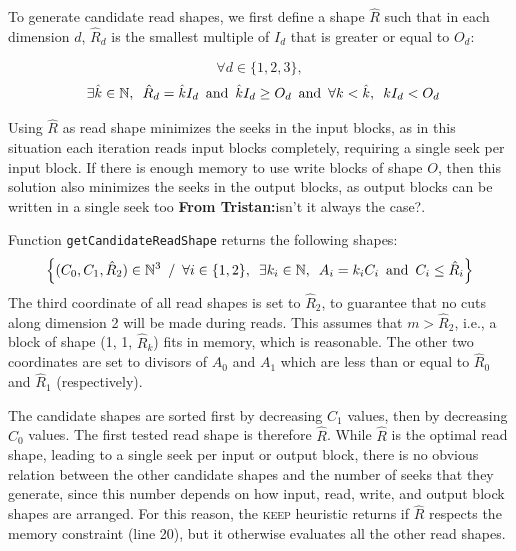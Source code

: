 \documentclass[sigconf, nonacm]{acmart}
\newcommand{\tristan}[1]{\color{orange}\textbf{From Tristan:}#1\color{black}}
\newcommand{\keep}[0]{\textsc{keep}\xspace}
\begin{document}

To generate candidate read shapes, we first define a shape $\hat R$ such
that in each dimension $d$, $\hat R_d$ is the smallest multiple of $I_d$
that is greater or equal to $O_d$:

\[
\forall d \in \{1, 2, 3\},
\]
\[
  \enskip \exists \hat k \in \mathbb{N}, \enskip \hat R_d = \hat kI_d \enskip \mathrm{and} \enskip \hat k I_d \geq O_d \enskip \mathrm{and} \enskip \forall k < \hat k, \enskip kI_d < O_d
\]

Using $\hat R$ as read shape minimizes the seeks in the input blocks, as
in this situation each iteration reads input blocks completely, requiring a
single seek per input block. If there is enough memory to use write blocks
of shape $O$, then this solution also minimizes the seeks in the output
blocks, as output blocks can be written in a single seek too \tristan{isn't it always the case?}.

Function \texttt{getCandidateReadShape} returns the following shapes:
\[
  \Big\{ (C_0, C_1, \hat R_2) \in \mathbb{N}^3 \enskip / \enskip
          \forall i \in \{1, 2\}, \enskip \exists k_i \in \mathbb{N}, \enskip
           A_i = k_iC_i \enskip \mathrm{and} \enskip C_i \leq \hat R_i \Big\}
\]
The third coordinate of all read shapes is set to $\hat R_2$, to guarantee
that no cuts along dimension 2 will be made during reads. This assumes that
$m > \hat R_2$, i.e., a block of shape (1, 1, $\hat R_k$) fits in
memory, which is reasonable. The other two coordinates are set to divisors of $A_0$ and $A_1$ which are
less than or equal to $\hat R_0$ and $\hat R_1$ (respectively).

The candidate shapes are sorted first by decreasing $C_1$ values, then by
decreasing $C_0$ values. The first tested read shape is therefore
$\hat R$. While $\hat R$ is the optimal read shape, leading to a single
seek per input or output block, there is no obvious relation between the
other candidate shapes and the number of seeks that they generate, since
this number depends on how input, read, write, and output block shapes are
arranged. For this reason, the \keep heuristic returns if $\hat R$
respects the memory constraint (line 20), but it otherwise evaluates all
the other read shapes.
\end{document}
